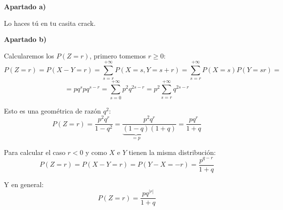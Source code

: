 \documentclass[openany]{book}
\begin{document}
\begin{exercise}
    \begin{flushright}
        \textbf{Apartado a)}
    \end{flushright}
    Lo haces tú en tu casita crack.

    \begin{flushright}
        \textbf{Apartado b)}
    \end{flushright}
    Calcularemos los $ P(Z=r) $, primero tomemos $ r \geq 0 $:
    $$ P (Z=r) = P(X-Y = r) = \sum\limits_{s=r}^{+\infty} P(X=s,Y=s+r) = \sum\limits_{s=r}^{+\infty} P (X=s)P(Y=s r)  = $$
    $$ = p q ^{s} p q^{s-r} = \sum\limits_{s=0}^{+\infty}p^2q^{2s-r} = p^2 \sum\limits_{s=r}^{+\infty}q^{2s-r}  $$

    Esto es una geométrica de razón $ q^2 $:
    $$ P(Z=r) = \dfrac{p^2q^{r}}{1-q^2} = \dfrac{p^2q^{r}}{\underbrace{(1-q)}_{=p}(1+q)} = \dfrac{pq^{r}}{1+q} $$

    Para calcular el caso $ r<0 $ y como $ X $ e $ Y $ tienen la misma distribución:
    $$ P(Z=r) = P(X-Y = r) = P(Y-X = -r) = \dfrac{p^{q-r}}{1+q} $$

    Y en general:
    $$ P(Z=r) = \dfrac{pq^{|r|}}{1+q} $$

\end{exercise}
\end{document}
